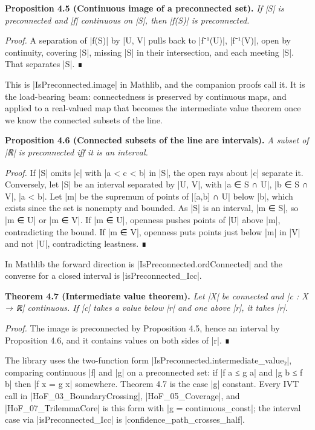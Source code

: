 \documentclass{memoir}
\begin{document}
\textbf{Proposition 4.5 (Continuous image of a preconnected set).} \emph{If \LeanVerb|S| is preconnected
and \LeanVerb|f| continuous on \LeanVerb|S|, then \LeanVerb|f(S)| is preconnected.}

\emph{Proof.} A separation of \LeanVerb|f(S)| by \LeanVerb|U, V| pulls back to \LeanVerb|f⁻¹(U)|, \LeanVerb|f⁻¹(V)|, open by
continuity, covering \LeanVerb|S|, missing \LeanVerb|S| in their intersection, and each meeting
\LeanVerb|S|. That separates \LeanVerb|S|. ∎

This is \LeanVerb|IsPreconnected.image| in Mathlib, and the companion proofs call it. It
is the load-bearing beam: connectedness is preserved by continuous maps, and
applied to a real-valued map that becomes the intermediate value theorem once we
know the connected subsets of the line.

\textbf{Proposition 4.6 (Connected subsets of the line are intervals).} \emph{A subset of \LeanVerb|ℝ| is
preconnected iff it is an interval.}

\emph{Proof.} If \LeanVerb|S| omits \LeanVerb|c| with \LeanVerb|a < c < b| in \LeanVerb|S|, the open rays about \LeanVerb|c| separate it.
Conversely, let \LeanVerb|S| be an interval separated by \LeanVerb|U, V|, with \LeanVerb|a ∈ S ∩ U|, \LeanVerb|b ∈ S ∩ V|,
\LeanVerb|a < b|. Let \LeanVerb|m| be the supremum of points of \LeanVerb|[a,b] ∩ U| below \LeanVerb|b|, which
exists since the set is nonempty and bounded. As \LeanVerb|S| is an interval, \LeanVerb|m ∈ S|, so
\LeanVerb|m ∈ U| or \LeanVerb|m ∈ V|. If \LeanVerb|m ∈ U|, openness pushes points of \LeanVerb|U| above \LeanVerb|m|,
contradicting the bound. If \LeanVerb|m ∈ V|, openness puts points just below \LeanVerb|m| in \LeanVerb|V|
and not \LeanVerb|U|, contradicting leastness. ∎

In Mathlib the forward direction is \LeanVerb|IsPreconnected.ordConnected| and the
converse for a closed interval is \LeanVerb|isPreconnected_Icc|.

\textbf{Theorem 4.7 (Intermediate value theorem).} \emph{Let \LeanVerb|X| be connected and \LeanVerb|c : X → ℝ|
continuous. If \LeanVerb|c| takes a value below \LeanVerb|r| and one above \LeanVerb|r|, it takes \LeanVerb|r|.}

\emph{Proof.} The image is preconnected by Proposition 4.5, hence an interval by
Proposition 4.6, and it contains values on both sides of \LeanVerb|r|. ∎

The library uses the two-function form \LeanVerb|IsPreconnected.intermediate_value₂|,
comparing continuous \LeanVerb|f| and \LeanVerb|g| on a preconnected set: if \LeanVerb|f a ≤ g a| and \LeanVerb|g b ≤ f b|
then \LeanVerb|f x = g x| somewhere. Theorem 4.7 is the case \LeanVerb|g| constant. Every IVT call
in \LeanVerb|HoF_03_BoundaryCrossing|, \LeanVerb|HoF_05_Coverage|, and \LeanVerb|HoF_07_TrilemmaCore| is
this form with \LeanVerb|g = continuous_const|; the interval case via
\LeanVerb|isPreconnected_Icc| is \LeanVerb|confidence_path_crosses_half|.
\end{document}
